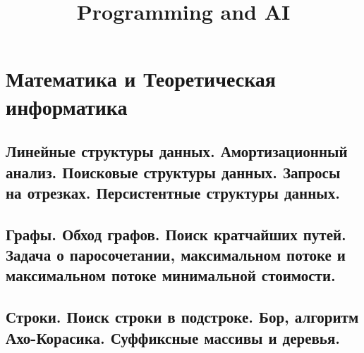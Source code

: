 \documentclass{article}
\title{Programming and AI} %
\begin{document}
	
\maketitle %
\tableofcontents
\section{Математика и Теоретическая информатика}



































\subsection{Линейные структуры данных. Амортизационный анализ. Поисковые структуры данных. Запросы на отрезках. Персистентные структуры данных.}

\subsection{Графы. Обход графов. Поиск кратчайших путей. Задача о паросочетании, максимальном потоке и максимальном потоке минимальной стоимости.}

\subsection{Строки. Поиск строки в подстроке. Бор, алгоритм Ахо-Корасика. Суффиксные массивы и деревья.}
\end{document}
